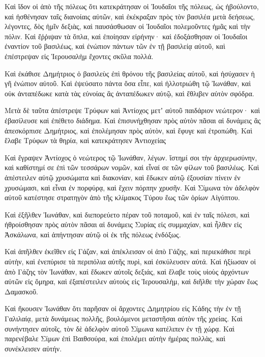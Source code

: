 {\par }{\PP {}Καὶ ἴδον οἱ ἀπὸ τῆς πόλεως ὅτι κατεκράτησαν οἱ Ἰουδαῖοι τῆς πόλεως, ὡς ἠβούλοντο, καὶ ἠσθένησαν ταῖς διανοίαις αὐτῶν, καὶ ἐκέκραξαν πρὸς τὸν βασιλέα μετὰ δεήσεως, λέγοντες,
δὸς ἡμῖν δεξιὰς, καὶ παυσάσθωσαν οἱ Ἰουδαῖοι πολεμοῦντες ἡμᾶς καὶ τὴν πόλιν.
Καὶ ἔῤῥιψαν τὰ ὅπλα, καὶ ἐποίησαν εἰρήνην· καὶ ἐδοξάσθησαν οἱ Ἰουδαῖοι ἐναντίον τοῦ βασιλέως, καὶ ἐνώπιον πάντων τῶν ἐν τῇ βασιλείᾳ αὐτοῦ, καὶ ἐπέστρεψαν εἰς Ἱερουσαλὴμ ἔχοντες σκῦλα πολλά.
\par }{\PP {}Καὶ ἐκάθισε Δημήτριος ὁ βασιλεὺς ἐπὶ θρόνου τῆς βασιλείας αὐτοῦ, καὶ ἡσύχασεν ἡ γῆ ἐνώπιον αὐτοῦ.
Καὶ ἐψεύσατο πάντα ὅσα εἶπε, καὶ ἠλλοτριώθη τῷ Ἰωνάθαν, καὶ οὐκ ἀνταπέδωκε κατὰ τὰς εὐνοίας ἃς ἀνταπέδωκεν αὐτῷ, καὶ ἔθλιβεν αὐτὸν σφόδρα.
\par }{\PP {}Μετὰ δὲ ταῦτα ἀπέστρεψε Τρύφων καὶ Ἀντίοχος μετʼ αὐτοῦ παιδάριον νεώτερον· καὶ ἐβασίλευσε καὶ ἐπέθετο διάδημα.
Καὶ ἐπισυνήχθησαν πρὸς αὐτὸν πᾶσαι αἱ δυνάμεις ἃς ἀπεσκόρπισε Δημήτριος, καὶ ἐπολέμησαν πρὸς αὐτὸν, καὶ ἔφυγε καὶ ἐτροπώθη.
Καὶ ἔλαβε Τρύφων τὰ θηρία, καὶ κατεκράτησεν Ἀντιοχείας
\par }{\PP {}Καὶ ἔγραψεν Ἀντίοχος ὁ νεώτερος τῷ Ἰωνάθαν, λέγων. ἵστημί σοι τὴν ἀρχιερωσύνην, καὶ καθίστημί σε ἐπὶ τῶν τεσσάρων νομῶν, καὶ εἶναί σε τῶν φίλων τοῦ βασιλέως.
Καὶ ἀπέστειλεν αὐτῷ χρυσώματα καὶ διακονίαν, καὶ ἔδωκεν αὐτῷ ἐξουσίαν πίνειν ἐν χρυσώμασι, καὶ εἶναι ἐν πορφύρᾳ, καὶ ἔχειν πόρπην χρυσῆν.
Καὶ Σίμωνα τὸν ἀδελφὸν αὐτοῦ κατέστησε στρατηγὸν ἀπὸ τῆς κλίμακος Τύρου ἕως τῶν ὁρίων Αἰγύπτου.
\par }{\PP {}Καὶ ἐξῆλθεν Ἰωνάθαν, καὶ διεπορεύετο πέραν τοῦ ποταμοῦ, καὶ ἐν ταῖς πόλεσι, καὶ ἠθροίσθησαν πρὸς αὐτὸν πᾶσαι αἱ δυνάμεις Συρίας εἰς συμμαχίαν, καὶ ἦλθεν εἰς Ἀσκάλωνα, καὶ ἀπήντησαν αὐτῷ οἱ ἐκ τῆς πόλεως ἐνδόξως.
\par }{\PP {}Καὶ ἀπῆλθεν ἐκεῖθεν εἰς Γάζαν, καὶ ἀπέκλεισαν οἱ ἀπὸ Γάζης, καὶ περιεκάθισε περὶ αὐτὴν, καὶ ἐνεπύρισε τὰ περιπόλια αὐτῆς πυρὶ, καὶ ἐσκύλευσεν αὐτά.
Καὶ ἠξίωσαν οἱ ἀπὸ Γάζης τὸν Ἰωνάθαν, καὶ ἔδωκεν αὐτοῖς δεξιάς, καὶ ἔλαβε τοὺς υἱοὺς ἀρχόντων αὐτῶν εἰς ὅμηρα, καὶ ἐξαπέστειλεν αὐτοὺς εἰς Ἱερουσαλὴμ, καὶ διῆλθε τὴν χώραν ἕως Δαμασκοῦ.
\par }{\PP {}Καὶ ἤκουσεν Ἰωνάθαν ὅτι παρῆσαν οἱ ἄρχοντες Δημητρίου εἰς Κάδης τὴν ἐν τῇ Γαλιλαίᾳ, μετὰ δυνάμεως πολλῆς, βουλόμενοι μεταστῆσαι αὐτὸν τῆς χρείας.
Καὶ συνήντησεν αὐτοῖς, τὸν δὲ ἀδελφὸν αὐτοῦ Σίμωνα κατέλιπεν ἐν τῇ χώρᾳ.
Καὶ παρενέβαλε Σίμων ἐπὶ Βαιθσούρα, καὶ ἐπολέμει αὐτὴν ἡμέρας πολλὰς, καὶ συνέκλεισεν αὐτήν.
}
